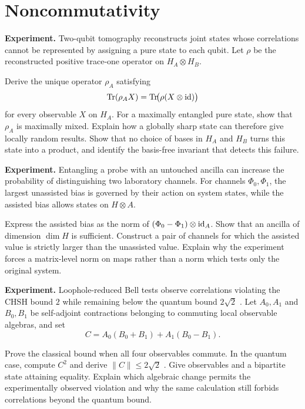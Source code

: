 \section{Noncommutativity}

\begin{exercise}
\textbf{Experiment.}
Two-qubit tomography reconstructs joint states whose correlations cannot be
represented by assigning a pure state to each qubit.  Let
\(\rho\) be the reconstructed positive trace-one operator on
\(H_A\otimes H_B\).

Derive the unique operator \(\rho_A\) satisfying
\[
        \operatorname{Tr}(\rho_A X)=\operatorname{Tr}\!\bigl(\rho(X\otimes\operatorname{id})\bigr)
\]
for every observable \(X\) on \(H_A\).  For a maximally entangled pure state,
show that \(\rho_A\) is maximally mixed.  Explain how a globally sharp state
can therefore give locally random results.  Show that no choice of bases in
\(H_A\) and \(H_B\) turns this state into a product, and identify the
basis-free invariant that detects this failure.
\end{exercise}

\begin{exercise}
\textbf{Experiment.}
Entangling a probe with an untouched ancilla can increase the probability of
distinguishing two laboratory channels.  For channels \(\Phi_0,\Phi_1\), the
largest unassisted bias is governed by their action on system states, while
the assisted bias allows states on \(H\otimes A\).

Express the assisted bias as the norm of
\((\Phi_0-\Phi_1)\otimes\operatorname{id}_A\).  Show that an ancilla of dimension
\(\dim H\) is sufficient.  Construct a pair of channels for which the
assisted value is strictly larger than the unassisted value.  Explain why the
experiment forces a matrix-level norm on maps rather than a norm which tests
only the original system.
\end{exercise}

\begin{exercise}
\textbf{Experiment.}
Loophole-reduced Bell tests observe correlations violating the CHSH bound
\(2\) while remaining below the quantum bound \(2\sqrt2\)
\cite{hensen}.  Let \(A_0,A_1\) and \(B_0,B_1\) be self-adjoint contractions
belonging to commuting local observable algebras, and set
\[
        C=A_0(B_0+B_1)+A_1(B_0-B_1).
\]

Prove the classical bound when all four observables commute.  In the quantum
case, compute \(C^2\) and derive \(\|C\|\le2\sqrt2\)
\cite{tsirelson}.  Give observables and a bipartite state attaining equality.
Explain which algebraic change permits the experimentally observed violation
and why the same calculation still forbids correlations beyond the quantum
bound.
\end{exercise}

